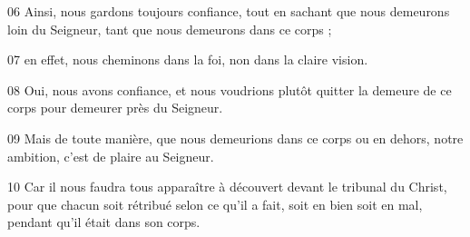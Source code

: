 
06 Ainsi, nous gardons toujours confiance, tout en sachant que nous demeurons loin du Seigneur, tant que nous demeurons dans ce corps ;

07 en effet, nous cheminons dans la foi, non dans la claire vision.

08 Oui, nous avons confiance, et nous voudrions plutôt quitter la demeure de ce corps pour demeurer près du Seigneur.

09 Mais de toute manière, que nous demeurions dans ce corps ou en dehors, notre ambition, c’est de plaire au Seigneur.

10 Car il nous faudra tous apparaître à découvert devant le tribunal du Christ, pour que chacun soit rétribué selon ce qu’il a fait, soit en bien soit en mal, pendant qu’il était dans son corps.
